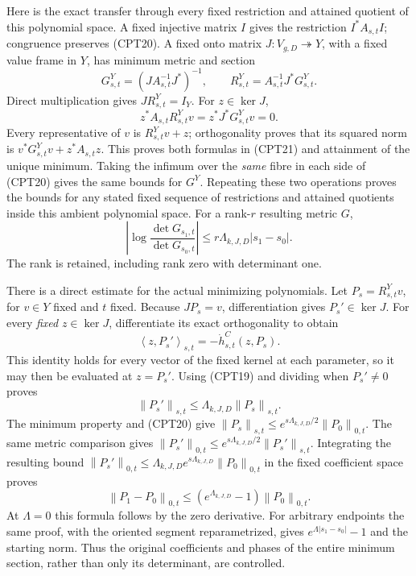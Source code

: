 \documentclass[11pt]{article}
\newcommand{\norm}[1]{\left\lVert#1\right\rVert}
\newcommand{\ip}[2]{\left\langle#1,#2\right\rangle}
\begin{document}
Here is the exact transfer through every fixed restriction and
attained quotient of this polynomial space.  A fixed injective
matrix \(I\) gives the restriction \(I^*A_{s,t}I\); congruence
preserves (CPT20).  A fixed onto matrix
\(J:V_{g,D}\twoheadrightarrow Y\), with a fixed value frame in \(Y\),
has minimum metric and section
\begin{equation}\tag{CPT21}
 G^Y_{s,t}=(J A_{s,t}^{-1}J^*)^{-1},\qquad
 R^Y_{s,t}=A_{s,t}^{-1}J^*G^Y_{s,t}.
\end{equation}
Direct multiplication gives \(JR^Y_{s,t}=I_Y\).
For \(z\in\ker J\),
\[
 z^*A_{s,t}R^Y_{s,t}v=z^*J^*G^Y_{s,t}v=0.
\]
Every representative of \(v\) is \(R^Y_{s,t}v+z\); orthogonality
proves that its squared norm is
\(v^*G^Y_{s,t}v+z^*A_{s,t}z\).
This proves both formulas in (CPT21) and attainment of the unique
minimum.  Taking the infimum over the \emph{same} fibre in each
side of (CPT20) gives the same bounds for \(G^Y\).
Repeating these two operations proves the bounds for any stated
fixed sequence of restrictions and attained quotients inside this
ambient polynomial space.  For a rank-\(r\) resulting metric \(G\),
\begin{equation}\tag{CPT22}
 \left|\log\frac{\det G_{s_1,t}}{\det G_{s_0,t}}\right|
 \le r\Lambda_{k,J,D}|s_1-s_0|.
\end{equation}
The rank is retained, including rank zero with determinant one.

There is a direct estimate for the actual minimizing polynomials.
Let \(P_s=R^Y_{s,t}v\), for \(v\in Y\) fixed and \(t\) fixed.
Because \(JP_s=v\), differentiation gives \(P_s'\in\ker J\).
For every \emph{fixed} \(z\in\ker J\), differentiate its exact
orthogonality to obtain
\[
 \ip{z}{P_s'}_{s,t}=-\dot h^C_{s,t}(z,P_s).
\]
This identity holds for every vector of the fixed kernel at each
parameter, so it may then be evaluated at \(z=P_s'\).
Using (CPT19) and dividing when \(P_s'\ne0\) proves
\begin{equation}\tag{CPT23}
 \norm{P_s'}_{s,t}\le
 \Lambda_{k,J,D}\norm{P_s}_{s,t}.
\end{equation}
The minimum property and (CPT20) give
\(\norm{P_s}_{s,t}\le e^{s\Lambda_{k,J,D}/2}
\norm{P_0}_{0,t}\).
The same metric comparison gives
\(\norm{P_s'}_{0,t}\le e^{s\Lambda_{k,J,D}/2}
\norm{P_s'}_{s,t}\).
Integrating the resulting bound
\(\norm{P_s'}_{0,t}\le
\Lambda_{k,J,D}e^{s\Lambda_{k,J,D}}\norm{P_0}_{0,t}\)
in the fixed coefficient space proves
\begin{equation}\tag{CPT24}
 \boxed{\norm{P_1-P_0}_{0,t}
 \le(e^{\Lambda_{k,J,D}}-1)\norm{P_0}_{0,t}.}
\end{equation}
At \(\Lambda=0\) this formula follows by the zero derivative.
For arbitrary endpoints the same proof, with the oriented segment
reparametrized, gives \(e^{\Lambda|s_1-s_0|}-1\) and the starting
norm.  Thus the original coefficients and phases of the entire
minimum section, rather than only its determinant, are controlled.
\end{document}
